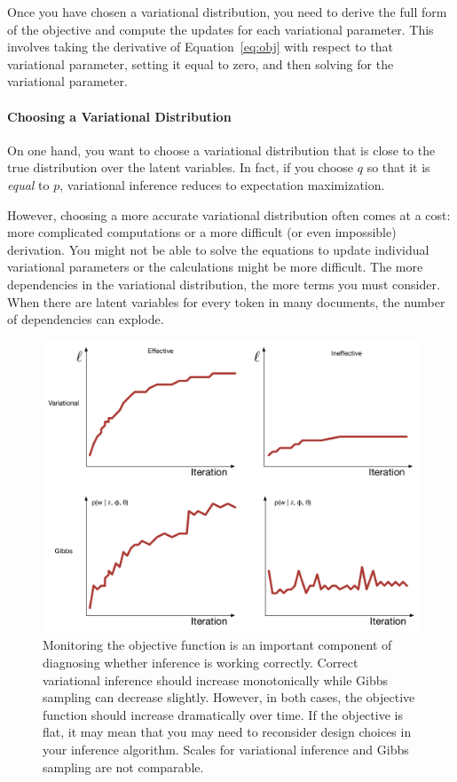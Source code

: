 Once you have chosen a variational distribution, you need to derive
the full form of the objective and compute the updates for each
variational parameter.  This involves taking the derivative of
Equation~\ref{eq:obj} with respect to that variational parameter,
setting it equal to zero, and then solving for the variational parameter.

\paragraph{Choosing a Variational Distribution}

On one hand, you want to choose a variational distribution that is
close to the true distribution over the latent variables.  In fact, if
you choose $q$ so that it is \emph{equal} to $p$, variational
inference reduces to expectation maximization.

However, choosing a more accurate variational distribution often comes at a cost: more complicated computations or
a more difficult (or even impossible) derivation.  You might not be
able to solve the equations to update individual variational
parameters or the calculations might be more difficult. The more
dependencies in the variational distribution, the more terms you must
consider.  When there are latent variables for every token in many
documents, the number of dependencies can explode.

\begin{figure}
  \includegraphics[width=.9\linewidth]{figures/objective_functions}

  \caption{Monitoring the objective function is an important component
  of diagnosing whether inference is working correctly.  Correct
  variational inference should increase monotonically while Gibbs
  sampling can decrease slightly.  However, in both cases, the
  objective function should increase dramatically over time.  If the
  objective is flat, it may mean that you may need to reconsider design choices
  in your inference algorithm.  Scales for variational inference and Gibbs sampling are not
  comparable.}
  \label{fig:objective_func}
\end{figure}

